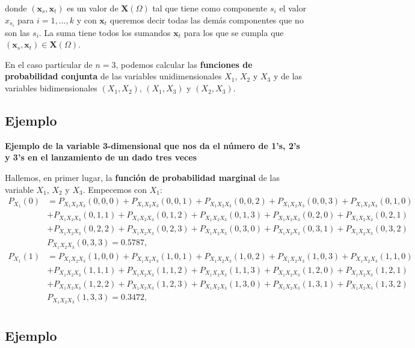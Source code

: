 \documentclass[]{book}
\begin{document}
donde \((\mathbf{x}_s,\mathbf{x}_t)\) es un valor de \(\mathbf{X}(\Omega)\) tal que tiene como componente \(s_i\) el valor \(x_{s_i}\) para \(i=1,\ldots, k\) y con \(\mathbf{x}_t\) queremos decir todas las demás componentes que no son las \(s_i\). La suma tiene todos los sumandos \(\mathbf{x}_t\) para los que se cumpla que \((\mathbf{x}_s,\mathbf{x}_t)\in \mathbf{X}(\Omega)\).

En el caso particular de \(n=3\), podemos calcular las \textbf{funciones de probabilidad conjunta} de las variables unidimensionales \(X_1\), \(X_2\) y \(X_3\) y de las variables bidimensionales \((X_1,X_2)\), \((X_1,X_3)\) y \((X_2,X_3)\).

\hypertarget{ejemplo-91}{%
\subsection{Ejemplo}\label{ejemplo-91}}

\textbf{Ejemplo de la variable 3-dimensional que nos da el número de 1's, 2's y 3's en el lanzamiento de un dado tres veces}

Hallemos, en primer lugar, la \textbf{función de probabilidad marginal} de las variable \(X_1\), \(X_2\) y \(X_3\). Empecemos con \(X_1\):
\[
\begin{array}{rl}
P_{X_1}(0) & = P_{X_1X_2X_3}(0,0,0)+P_{X_1X_2X_3}(0,0,1)+P_{X_1X_2X_3}(0,0,2)+P_{X_1X_2X_3}(0,0,3)+P_{X_1X_2X_3}(0,1,0) \\ & +P_{X_1X_2X_3}(0,1,1)+P_{X_1X_2X_3}(0,1,2)+P_{X_1X_2X_3}(0,1,3)+P_{X_1X_2X_3}(0,2,0)+P_{X_1X_2X_3}(0,2,1)\\ &
+P_{X_1X_2X_3}(0,2,2)+P_{X_1X_2X_3}(0,2,3)+P_{X_1X_2X_3}(0,3,0)+P_{X_1X_2X_3}(0,3,1)+P_{X_1X_2X_3}(0,3,2)\\ &
P_{X_1X_2X_3}(0,3,3)=0.5787,\\
P_{X_1}(1) & = P_{X_1X_2X_3}(1,0,0)+P_{X_1X_2X_3}(1,0,1)+P_{X_1X_2X_3}(1,0,2)+P_{X_1X_2X_3}(1,0,3)+P_{X_1X_2X_3}(1,1,0) \\ & +P_{X_1X_2X_3}(1,1,1)+P_{X_1X_2X_3}(1,1,2)+P_{X_1X_2X_3}(1,1,3)+P_{X_1X_2X_3}(1,2,0)+P_{X_1X_2X_3}(1,2,1)\\ &
+P_{X_1X_2X_3}(1,2,2)+P_{X_1X_2X_3}(1,2,3)+P_{X_1X_2X_3}(1,3,0)+P_{X_1X_2X_3}(1,3,1)+P_{X_1X_2X_3}(1,3,2)\\ &
P_{X_1X_2X_3}(1,3,3)=0.3472,\\
\end{array}
\]

\hypertarget{ejemplo-92}{%
\subsection{Ejemplo}\label{ejemplo-92}}
\end{document}
